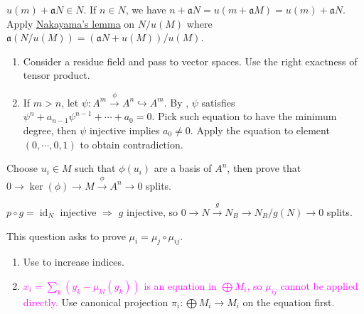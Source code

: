\begin{exercise}\label{ex2.10}
	$u(m)+\mathfrak{a}N\in N$. If $n\in N$, we have $n+\mathfrak{a}N=u(m+\mathfrak{a}M)=u(m)+\mathfrak{a}N$. Apply \hyperref[2.6]{Nakayama's lemma} on $N/u(M)$ where $\mathfrak{a}(N/u(M))=\left(\mathfrak{a}N+u(M)\right)/u(M)$.
\end{exercise}

\begin{exercise}\label{ex2.11}
	\begin{enumerate}
		\item[(i),(ii)] Consider a residue field and pass to vector spaces. Use the right exactness of tensor product.
		\item[(iii)] If $m>n$, let $\psi:A^m\xrightarrow{\phi}A^n\hookrightarrow A^m$. By , $\psi$ satisfies $\psi^n+a_{n-1}\psi^{n-1}+\cdots+a_0=0$. Pick such equation to have the minimum degree, then $\psi$ injective implies $a_0\neq0$. Apply the equation to element $(0,\cdots,0,1)$ to obtain contradiction.
	\end{enumerate}
\end{exercise}

\begin{exercise}\label{ex2.12}
	Choose $u_i\in M$ such that $\phi\left(u_i\right)$ are a basis of $A^n$, then prove that $0\rightarrow\ker(\phi)\rightarrow M\xrightarrow{\phi}A^n\rightarrow0$ splits.
\end{exercise}

\begin{exercise}\label{ex2.13}
	$p\circ g=\operatorname{id}_N$ injective $\Rightarrow$ $g$ injective, so $0\rightarrow N\xrightarrow{g}N_B\rightarrow N_B/g(N)\rightarrow0$ splits.
\end{exercise}

\begin{exercise}\label{ex2.14}
	This question asks to prove $\mu_i=\mu_j\circ\mu_{ij}$.
\end{exercise}

\begin{exercise}\label{ex2.15}
	\begin{enumerate}[label=(\roman*),ref=\theexercise(\roman*)]
		\item\label{ex2.15.1} Use  to increase indices.
		\item\label{ex2.15.2} \textcolor{magenta}{$x_i=\sum_k\left(y_k-\mu_{kl}\left(y_k\right)\right)$ is an equation in $\bigoplus M_i$, so $\mu_{ij}$ cannot be applied directly.} Use canonical projection $\pi_i:\bigoplus M_i\rightarrow M_i$ on the equation first.
	\end{enumerate}
\end{exercise}

